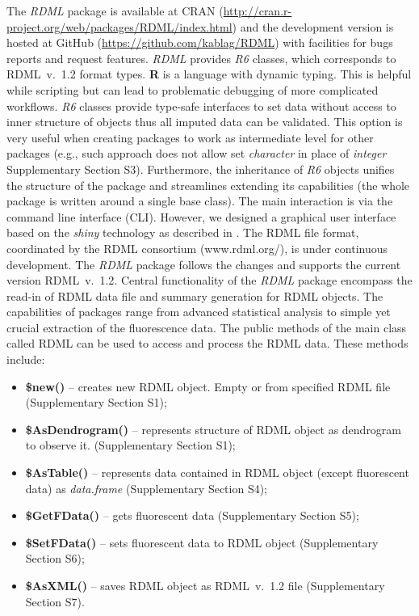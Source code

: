 \documentclass{bioinfo}
\begin{document}
The \textit{RDML} package is available at CRAN 
(\url{http://cran.r-project.org/web/packages/RDML/index.html}) and the 
development version is hosted at GitHub (\url{https://github.com/kablag/RDML}) 
with facilities for bugs reports and request features. \textit{RDML} provides 
\emph{R6} classes, which corresponds to RDML~v.~1.2 format types. \textbf{R} 
is a language with dynamic typing. This is helpful while scripting but can lead 
to problematic debugging of more complicated workflows. \emph{R6} classes 
provide type-safe interfaces to set data without access to inner structure of 
objects thus all imputed data can be validated. This option is very useful when 
creating packages to work as intermediate level for other packages (e.g., such 
approach does not allow set \emph{character} in place of \emph{integer} 
Supplementary Section S3). Furthermore, the inheritance of \emph{R6} objects 
unifies the structure of the package and streamlines extending its capabilities 
(the whole package is written around a single base class). The main interaction 
is via the command line interface (CLI). However, we designed a graphical user 
interface based on the \textit{shiny} technology as described in 
\cite{roediger2015chippcr}. The RDML file format, coordinated by the RDML 
consortium (www.rdml.org/), is under continuous development. The \textit{RDML} 
package follows the changes and supports the current version RDML~v.~1.2. 
Central functionality of the \textit{RDML} package encompass the read-in of RDML 
data file and summary generation for RDML objects. The capabilities of packages 
range from advanced statistical analysis to simple yet crucial extraction of the 
fluorescence data. The public methods of the main class called RDML can be used 
to access and process the RDML data. These methods include:

\begin{itemize} 
  \item \textbf{\$new()} -- creates new RDML object. Empty or from specified RDML 
  file (Supplementary Section S1); \item \textbf{\$AsDendrogram()} -- represents 
  structure of RDML object as dendrogram to observe it. (Supplementary Section 
  S1);
  \item \textbf{\$AsTable()} -- represents data contained in RDML object (except 
  fluorescent data) as \textit{data.frame} (Supplementary Section S4);
  \item \textbf{\$GetFData()} -- gets fluorescent data (Supplementary Section S5);
  \item \textbf{\$SetFData()} -- sets fluorescent data to RDML object (Supplementary Section S6); 
  \item \textbf{\$AsXML()} -- saves RDML object as RDML~v.~1.2 file (Supplementary Section S7).
\end{itemize}
	
\end{document}
